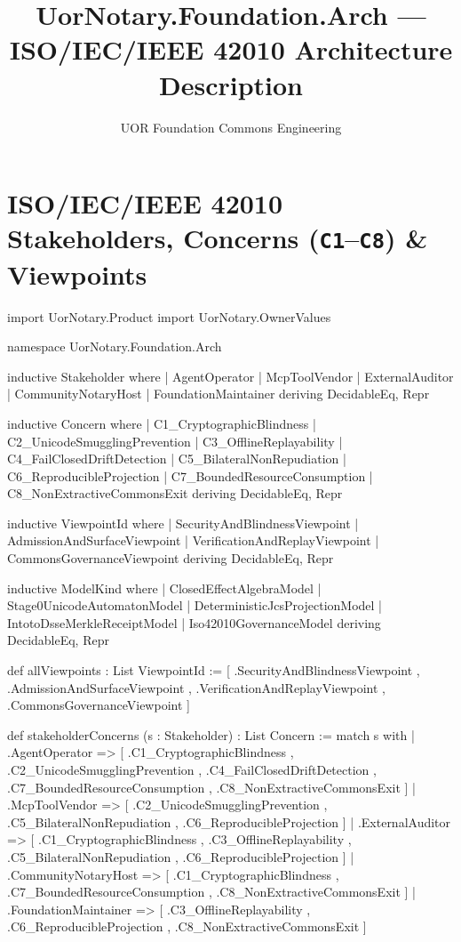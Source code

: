 \documentclass[12pt]{lexlean}
\title{UorNotary.Foundation.Arch --- ISO/IEC/IEEE 42010 Architecture Description}
\author{UOR Foundation Commons Engineering}
\begin{document}
\maketitle

\section{ISO/IEC/IEEE 42010 Stakeholders, Concerns (\texttt{C1}--\texttt{C8}) \& Viewpoints}

\begin{lean}
import UorNotary.Product
import UorNotary.OwnerValues

namespace UorNotary.Foundation.Arch

inductive Stakeholder where
  | AgentOperator
  | McpToolVendor
  | ExternalAuditor
  | CommunityNotaryHost
  | FoundationMaintainer
deriving DecidableEq, Repr

inductive Concern where
  | C1_CryptographicBlindness
  | C2_UnicodeSmugglingPrevention
  | C3_OfflineReplayability
  | C4_FailClosedDriftDetection
  | C5_BilateralNonRepudiation
  | C6_ReproducibleProjection
  | C7_BoundedResourceConsumption
  | C8_NonExtractiveCommonsExit
deriving DecidableEq, Repr

inductive ViewpointId where
  | SecurityAndBlindnessViewpoint
  | AdmissionAndSurfaceViewpoint
  | VerificationAndReplayViewpoint
  | CommonsGovernanceViewpoint
deriving DecidableEq, Repr

inductive ModelKind where
  | ClosedEffectAlgebraModel
  | Stage0UnicodeAutomatonModel
  | DeterministicJcsProjectionModel
  | IntotoDsseMerkleReceiptModel
  | Iso42010GovernanceModel
deriving DecidableEq, Repr

def allViewpoints : List ViewpointId :=
  [ .SecurityAndBlindnessViewpoint
  , .AdmissionAndSurfaceViewpoint
  , .VerificationAndReplayViewpoint
  , .CommonsGovernanceViewpoint
  ]

def stakeholderConcerns (s : Stakeholder) : List Concern :=
  match s with
  | .AgentOperator =>
      [ .C1_CryptographicBlindness
      , .C2_UnicodeSmugglingPrevention
      , .C4_FailClosedDriftDetection
      , .C7_BoundedResourceConsumption
      , .C8_NonExtractiveCommonsExit
      ]
  | .McpToolVendor =>
      [ .C2_UnicodeSmugglingPrevention
      , .C5_BilateralNonRepudiation
      , .C6_ReproducibleProjection
      ]
  | .ExternalAuditor =>
      [ .C1_CryptographicBlindness
      , .C3_OfflineReplayability
      , .C5_BilateralNonRepudiation
      , .C6_ReproducibleProjection
      ]
  | .CommunityNotaryHost =>
      [ .C1_CryptographicBlindness
      , .C7_BoundedResourceConsumption
      , .C8_NonExtractiveCommonsExit
      ]
  | .FoundationMaintainer =>
      [ .C3_OfflineReplayability
      , .C6_ReproducibleProjection
      , .C8_NonExtractiveCommonsExit
      ]


\end{lean}
\end{document}
